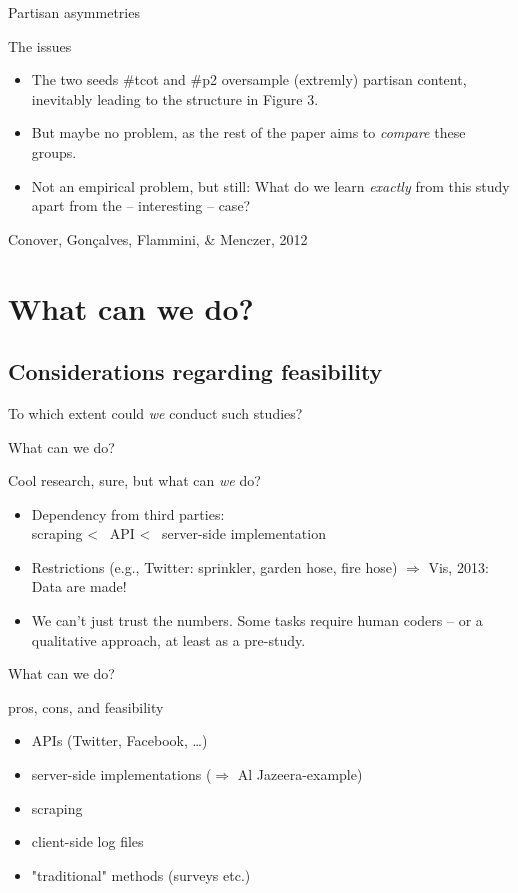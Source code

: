 \documentclass{beamer}
\begin{document}
\begin{frame}{Partisan asymmetries}
\begin{block}{The issues}
\begin{itemize}
\item The two seeds \#tcot and \#p2 oversample (extremly) partisan content, inevitably leading to the structure in Figure 3. 
\item But maybe no problem, as the rest of the paper aims to \emph{compare} these groups.
\item Not an empirical problem, but still: What do we learn \emph{exactly} from this study apart from the -- interesting -- case?
\end{itemize}
\end{block}
\footnotesize{Conover, Gonçalves, Flammini, \& Menczer, 2012}
\end{frame}




\section{What can we do?}

\subsection{Considerations regarding feasibility}
\begin{frame}{}
\huge{To which extent could \emph{we} conduct such studies?}
\end{frame}


\begin{frame}{What can we do?}
\begin{block}{Cool research, sure, but what can \emph{we} do?}
\begin{itemize}
\item Dependency from third parties: \\ scraping \textless ~ API \textless ~ server-side implementation 
\item Restrictions (e.g., Twitter: sprinkler, garden hose, fire hose) $\Rightarrow$ Vis, 2013: Data are made!
\item We can't just trust the numbers. Some tasks require human coders -- or a qualitative approach, at least as a pre-study.
\end{itemize}
\end{block}
\end{frame}


\begin{frame}{What can we do?}
\begin{block}{pros, cons, and feasibility}
\begin{itemize}
\item APIs (Twitter, Facebook, \dots)
\item server-side implementations ($\Rightarrow$ Al Jazeera-example)
\item scraping
\item client-side log files
\item "traditional" methods (surveys etc.)
\end{itemize}
\end{block}
\end{frame}
\end{document}
